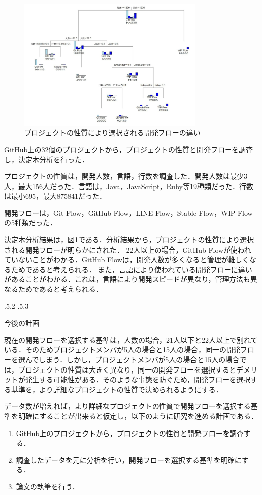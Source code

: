 \documentclass[uplatex,twocolumn]{jsarticle}
\makeatletter
\renewcommand{\section}{%
    \if@slide\clearpage\fi
    \@startsection{section}{1}{\z@}%
    {\Cvs \@plus.5\Cdp \@minus.2\Cdp}%
    {.5\Cvs \@plus.3\Cdp}%
    {\normalfont\raggedright}}
\makeatother
\begin{document}
\begin{figure}[H]
\includegraphics[width=9cm,clip]{images.pdf}
\caption{プロジェクトの性質により選択される開発フローの違い}\label{決定木}
\end{figure}


GitHub上の32個のプロジェクトから，プロジェクトの性質と開発フローを調査し，決定木分析を行った．

プロジェクトの性質は，開発人数，言語，行数を調査した．開発人数は最少3人，最大156人だった．言語は，Java，JavaScript，Ruby等19種類だった．行数は最小695，最大875841だった．


開発フローは，Git Flow，GitHub Flow，LINE Flow，Stable Flow，WIP Flowの5種類だった．

決定木分析結果は，図1である．分析結果から，プロジェクトの性質により選択される開発フローが明らかにされた．
22人以上の場合，GitHub Flowが使われていないことがわかる．GitHub Flowは，開発人数が多くなると管理が難しくなるためであると考えられる．
また，言語により使われている開発フローに違いがあることがわかる．これは，言語により開発スピードが異なり，管理方法も異なるためであると考えられる．





\section{今後の計画}


現在の開発フローを選択する基準は，人数の場合，21人以下と22人以上で別れている．そのためプロジェクトメンバが5人の場合と15人の場合，同一の開発フローを選んでしまう．しかし，プロジェクトメンバが5人の場合と15人の場合では，プロジェクトの性質は大きく異なり，同一の開発フローを選択するとデメリットが発生する可能性がある．そのような事態を防ぐため，開発フローを選択する基準を，より詳細なプロジェクトの性質で決められるようにする．

データ数が増えれば，より詳細なプロジェクトの性質で開発フローを選択する基準を明確にすることが出来ると仮定し，以下のように研究を進める計画である．

\begin{enumerate}
\item GitHub上のプロジェクトから，プロジェクトの性質と開発フローを調査する．
\item 調査したデータを元に分析を行い，開発フローを選択する基準を明確にする．
\item 論文の執筆を行う．
\end{enumerate}

\end{document}
